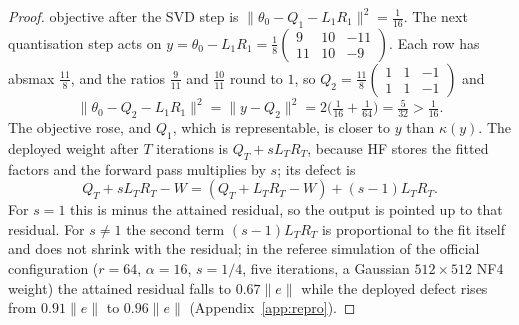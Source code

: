 \begin{proof}
objective after the SVD step is $\lVert\theta_0-Q_1-L_1R_1\rVert^2=\tfrac1{16}$. The next quantisation step acts on
$y=\theta_0-L_1R_1=\tfrac18\left(\begin{smallmatrix}9&10&-11\\11&10&-9\end{smallmatrix}\right)$. Each row has absmax
$\tfrac{11}8$, and the ratios $\tfrac9{11}$ and $\tfrac{10}{11}$ round to $1$, so $Q_2=\tfrac{11}8\left(\begin{smallmatrix}1&1&-1\\1&1&-1
\end{smallmatrix}\right)$ and
\[\lVert\theta_0-Q_2-L_1R_1\rVert^2=\lVert y-Q_2\rVert^2=2\Big(\tfrac1{16}+\tfrac1{64}\Big)=\tfrac5{32}>\tfrac1{16}.\]
The objective rose, and $Q_1$, which is representable, is closer to $y$ than $\kappa(y)$. The deployed weight after $T$
iterations is $Q_T+sL_TR_T$, because HF stores the fitted factors and the forward pass multiplies by $s$; its defect is
\[Q_T+sL_TR_T-W=(Q_T+L_TR_T-W)+(s-1)L_TR_T .\]
For $s=1$ this is minus the attained residual, so the output is pointed up to that residual. For $s\ne1$ the second term
$(s-1)L_TR_T$ is proportional to the fit itself and does not shrink with the residual; in the referee simulation of the official configuration ($r=64$, $\alpha=16$, $s=1/4$,
five iterations, a Gaussian $512\times512$ NF4 weight) the attained residual falls to $0.67\lVert e\rVert$ while the deployed
defect rises from $0.91\lVert e\rVert$ to $0.96\lVert e\rVert$ (Appendix~\ref{app:repro}).


\end{proof}
